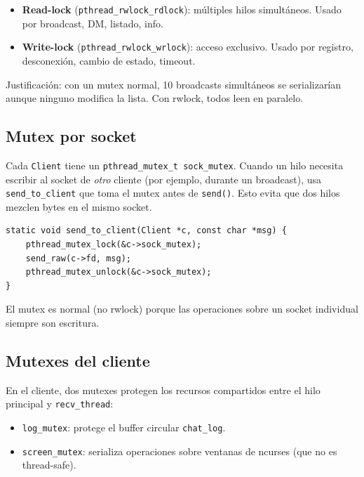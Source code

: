 \documentclass[12pt,a4paper]{article}
\begin{document}
\begin{itemize}[nosep]
    \item \textbf{Read-lock} (\texttt{pthread\_rwlock\_rdlock}): múltiples hilos
          simultáneos.  Usado por broadcast, DM, listado, info.
    \item \textbf{Write-lock} (\texttt{pthread\_rwlock\_wrlock}): acceso exclusivo.
          Usado por registro, desconexión, cambio de estado, timeout.
\end{itemize}

Justificación: con un mutex normal, 10 broadcasts simultáneos se serializarían
aunque ninguno modifica la lista.  Con rwlock, todos leen en paralelo.

\subsection{Mutex por socket}

Cada \texttt{Client} tiene un \texttt{pthread\_mutex\_t sock\_mutex}.  Cuando un
hilo necesita escribir al socket de \textit{otro} cliente (por ejemplo, durante un
broadcast), usa \texttt{send\_to\_client} que toma el mutex antes de
\texttt{send()}.  Esto evita que dos hilos mezclen bytes en el mismo socket.

\begin{lstlisting}[caption={send\_to\_client: escritura protegida a socket ajeno}]
static void send_to_client(Client *c, const char *msg) {
    pthread_mutex_lock(&c->sock_mutex);
    send_raw(c->fd, msg);
    pthread_mutex_unlock(&c->sock_mutex);
}
\end{lstlisting}

El mutex es normal (no rwlock) porque las operaciones sobre un socket individual
siempre son escritura.

\subsection{Mutexes del cliente}

En el cliente, dos mutexes protegen los recursos compartidos entre el hilo principal
y \texttt{recv\_thread}:

\begin{itemize}[nosep]
    \item \texttt{log\_mutex}: protege el buffer circular \texttt{chat\_log}.
    \item \texttt{screen\_mutex}: serializa operaciones sobre ventanas de ncurses
          (que no es thread-safe).
\end{itemize}
\end{document}
